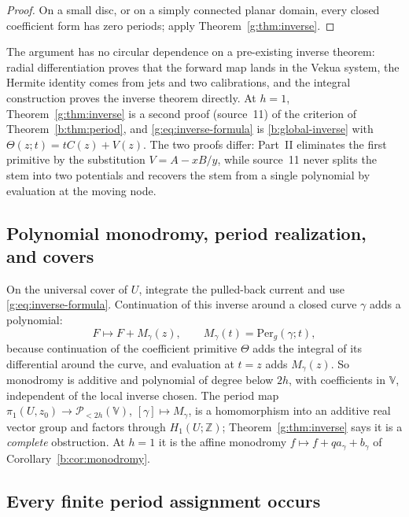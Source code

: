 \documentclass[11pt,a4paper]{article}
\numberwithin{equation}{section}
\theoremstyle{definition}
\theoremstyle{remark}
\theoremstyle{plain}
\newcommand{\ZZ}{\mathbb Z}
\newcommand{\Per}{\mathrm{Per}}
\newcommand{\pot}{C}          %
\newcommand{\potV}{V}         %
\newcommand{\VV}{\mathbb V}                       %
\newcommand{\PolH}{\mathscr P_{<2h}(\VV)}
\newcommand{\Herm}{\Theta}                        %
\begin{document}
\begin{proof}
On a small disc, or on a simply connected planar domain, every closed
coefficient form has zero periods; apply Theorem~\ref{g:thm:inverse}.
\end{proof}

The argument has no circular dependence on a pre-existing inverse theorem:
radial differentiation proves that the forward map lands in the Vekua system,
the Hermite identity comes from jets and two calibrations, and the integral
construction proves the inverse theorem directly. At $h=1$,
Theorem~\ref{g:thm:inverse} is a second proof (source~11) of the criterion of
Theorem~\ref{b:thm:period}, and \eqref{g:eq:inverse-formula} is
\eqref{b:global-inverse} with $\Herm(z;t)=t\pot(z)+\potV(z)$. The two proofs
differ: Part~II eliminates the first primitive by the substitution
$\potV=A-xB/y$, while source~11 never splits the stem into two potentials and
recovers the stem from a single polynomial by evaluation at the moving node.

\subsection{Polynomial monodromy, period realization, and covers}
\label{g:sub:monodromy}

On the universal cover of $U$, integrate the pulled-back current and use
\eqref{g:eq:inverse-formula}. Continuation of this inverse around a closed
curve $\gamma$ adds a polynomial:
\begin{equation}\label{g:eq:monodromy}
 F\longmapsto F+M_\gamma(z),\qquad M_\gamma(t)=\Per_g(\gamma;t),
\end{equation}
because continuation of the coefficient primitive $\Herm$ adds the integral
of its differential around the curve, and evaluation at $t=z$ adds
$M_\gamma(z)$. So monodromy is additive and polynomial of degree below $2h$,
with coefficients in $\VV$, independent of the local inverse chosen. The period
map $\pi_1(U,z_0)\to\PolH$, $[\gamma]\mapsto M_\gamma$, is a homomorphism into
an additive real vector group and factors through $H_1(U;\ZZ)$;
Theorem~\ref{g:thm:inverse} says it is a \emph{complete} obstruction. At $h=1$
it is the affine monodromy $f\mapsto f+qa_\gamma+b_\gamma$ of
Corollary~\ref{b:cor:monodromy}.

\subsection{Every finite period assignment occurs}
\label{g:sub:realization}
\end{document}
